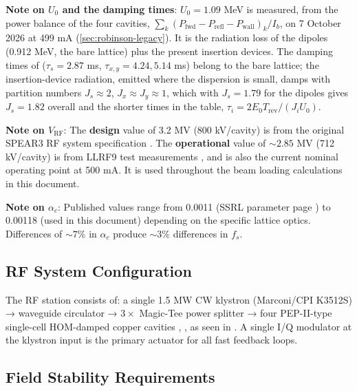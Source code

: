 \begin{keynote}
\textbf{Note on \(U_0\) and the damping times}: \(U_0 = 1.09\) MeV is measured, from the power balance of the four cavities, \(\sum_k (P_\text{fwd} - P_\text{refl} - P_\text{wall})_k / I_b\), on 7 October 2026 at 499 mA (\cref{sec:robinson-legacy}). It is the radiation loss of the dipoles (0.912 MeV, the bare lattice) plus the present insertion devices. The damping times of  (\(\tau_s = 2.87\) ms, \(\tau_{x,y} = 4.24, 5.14\) ms) belong to the bare lattice; the insertion-device radiation, emitted where the dispersion is small, damps with partition numbers \(J_s \approx 2\), \(J_x \approx J_y \approx 1\), which with \(J_s = 1.79\) for the dipoles gives \(J_s = 1.82\) overall and the shorter times in the table, \(\tau_i = 2E_0T_\text{rev}/(J_iU_0)\).
\end{keynote}

\begin{keynote}
\textbf{Note on \(V_\text{RF}\)}: The \textbf{design} value of 3.2 MV (800 kV/cavity) is from the original SPEAR3 RF system specification . The \textbf{operational} value of \(\sim 2.85\) MV (712 kV/cavity) is from LLRF9 test measurements , and is also the current nominal operating point at 500 mA. It is used throughout the beam loading calculations in this document.
\end{keynote}

\begin{keynote}
\textbf{Note on \(\alpha_c\)}: Published values range from 0.0011 (SSRL parameter page ) to 0.00118 (used in this document) depending on the specific lattice optics. Differences of \(\sim 7\%\) in \(\alpha_c\) produce \(\sim 3\%\) differences in \(f_s\).
\end{keynote}

\subsection{RF System Configuration}\label{sec:rf-config}


The RF station consists of: a single 1.5 MW CW klystron (Marconi/CPI K3512S) → waveguide circulator → \(3\times\) Magic-Tee power splitter → four PEP-II-type single-cell HOM-damped copper cavities , , as seen in . A single I/Q modulator at the klystron input is the primary actuator for all fast feedback loops.

\subsection{Field Stability Requirements}\label{sec:field-stability}


